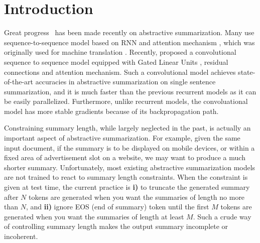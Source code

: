 \section{Introduction}
\label{sec:intro}


Great progress~\cite{RushCW15,ChopraAR16,NallapatiZSGX16,SeeLM17,PaulusXS17}
has been made recently on abstractive summarization.
Many use sequence-to-sequence model based on RNN
and attention mechanism \cite{RushCW15}, which was originally used
for machine translation \cite{SutskeverVL14,BahdanauCB14}.
Recently, \citet{gehring2017convs2s} proposed a convolutional 
sequence to sequence model equipped with
Gated Linear Units \cite{DauphinFAG17}, residual connections \cite{HeZRS16}
and attention mechanism. 
Such a convolutional model achieves state-of-the-art accuracies 
in abstractive summarization on single sentence summarization,
and it is much faster than the previous recurrent models as
it can be easily parallelized.
Furthermore, unlike recurrent models, the convoluational model has more stable
gradients because of its backpropagation path. 

Constraining summary length, while largely neglected in the past,
is actually an important aspect of abstractive summarization.
For example, given the same input document,
if the summary is to be displayed on mobile devices, or within
a fixed area of advertisement slot on a website,
we may want to produce a much shorter summary.
Unfortunately, most existing abstractive summarization models are not
trained to react to summary length constraints.
When the constraint is given at test time, the current
practice is \textbf{i)} to truncate the generated summary after $N$ tokens are generated when you want 
the summaries of length no more than $N$,
and \textbf{ii)} ignore EOS (end of summary) token until the first $M$ tokens are generated when you want
the summaries of length at least $M$.
Such a crude way of controlling
summary length makes the output summary incomplete or incoherent.

